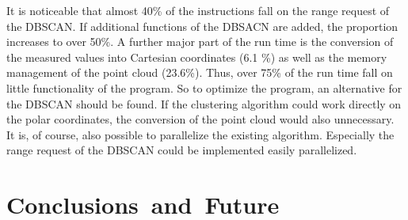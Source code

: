 \documentclass[11pt,oneside,openright]{mpreport}
\begin{document}
It is noticeable that almost 40\% of the instructions fall on the range request of the \ac{DBSCAN}.
If additional functions of the DBSACN are added, the proportion increases to over 50\%. A further major part of the run time is the conversion of the measured
values into Cartesian coordinates (6.1 \%) as well as the memory management of the point cloud (23.6\%).
Thus, over 75\% of the run time fall on little functionality of the program.
So to optimize the program, an alternative for the \ac{DBSCAN} should be found.
If the clustering algorithm could work directly on the polar coordinates, the conversion of the point cloud would also unnecessary.
It is, of course, also possible to parallelize the existing algorithm. Especially the range request of the \ac{DBSCAN} could be implemented easily parallelized.

\chapter{\mbox{Conclusions and Future}}
\end{document}
